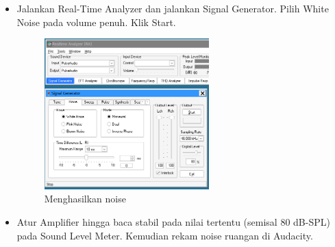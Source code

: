 \documentclass{article}
\begin{document}
\begin{itemize}
		\item Jalankan Real-Time Analyzer dan jalankan Signal Generator.
		Pilih White Noise pada volume penuh. Klik Start.

		\begin{figure}[H]
			\centering
			\includegraphics[width=0.6\textwidth,angle=0]{images/rta_noise_gen}
			\caption{Menghasilkan noise}
		\end{figure}

		\item Atur Amplifier hingga baca stabil pada nilai tertentu (semisal 80 dB-SPL) pada Sound Level Meter.
		Kemudian rekam noise ruangan di Audacity.


\end{itemize}
\end{document}
